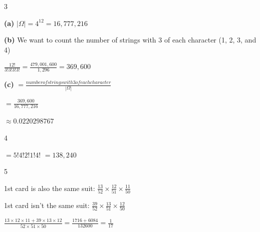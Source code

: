 \documentclass[12 pt]{article}
\begin{document}
    \begin{exercise}{3}
    \hfill
    
        \textbf{(a)} $|\Omega| = 4^{12} = 16,777,216$

        \textbf{(b)} We want to count the number of strings with 3 of each character (1, 2, 3, and 4)

        $\frac{12!}{3!3!3!3!} = \frac{479,001,600}{1,296} = 369,600$

        \textbf{(c)} $ = \frac{number of strings with 3 of each character}{|\Omega|}$

        $= \frac{369,600}{16,777,216}$

        $\approx 0.0220298767$
    \end{exercise}

    \begin{exercise}{4}
    \hfill
    
        $= 5!4!2!1!4!$
        $= 138,240$
    \end{exercise}

    \begin{exercise}{5}
    \hfill

        1st card is also the same suit: $\frac{13}{52} \times \frac{12}{51} \times \frac{11}{50}$

        1st card isn't the same suit: $\frac{39}{52} \times \frac{13}{51} \times \frac{12}{50}$

        $\frac{13 \times 12 \times 11 + 39 \times 13 \times 12}{52 \times 51 \times 50} = \frac{1716 + 6084}{132600} = \frac{1}{17}$

    \end{exercise}
\end{document}
